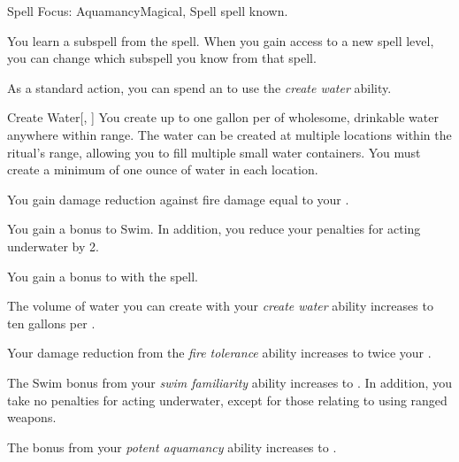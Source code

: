     \begin{feat}{Spell Focus: Aquamancy}{Magical, Spell}
        \featpre {} spell known.

         You learn a subspell from the  spell.
        When you gain access to a new spell level, you can change which subspell you know from that spell.

         As a standard action, you can spend an  to use the \textit{create water} ability.

        \begin{ability}{Create Water}[, ]
            You create up to one gallon per  of wholesome, drinkable water anywhere within \rngclose range.
            The water can be created at multiple locations within the ritual's range, allowing you to fill multiple small water containers.
            You must create a minimum of one ounce of water in each location.
        \end{ability}

         You gain damage reduction against fire damage equal to your .

         You gain a  bonus to Swim.
        In addition, you reduce your penalties for acting underwater by 2.

         You gain a  bonus to  with the  spell. 

         The volume of water you can create with your \textit{create water} ability increases to ten gallons per .

         Your damage reduction from the \textit{fire tolerance} ability increases to twice your .

         The Swim bonus from your \textit{swim familiarity} ability increases to .
        In addition, you take no penalties for acting underwater, except for those relating to using ranged weapons.

         The bonus from your \textit{potent aquamancy} ability increases to .
    \end{feat}

